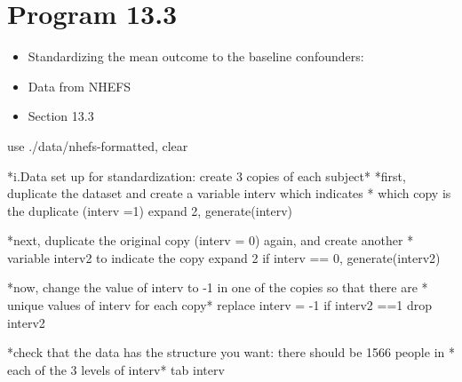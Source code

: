 \documentclass[
  10pt,
  a4paper,
]{book}
\newenvironment{Shaded}{\begin{snugshade}}{\end{snugshade}}
\newcommand{\KeywordTok}[1]{\textcolor[rgb]{0.00,0.46,0.62}{#1}}
\newcommand{\NormalTok}[1]{\textcolor[rgb]{0.00,0.46,0.62}{#1}}
\newcommand{\OtherTok}[1]{\textcolor[rgb]{0.00,0.46,0.62}{#1}}
\providecommand{\tightlist}{%
  \setlength{\itemsep}{0pt}\setlength{\parskip}{0pt}}
\begin{document}
\section{Program 13.3}\label{program-13.3-1}

\begin{itemize}
\tightlist
\item
  Standardizing the mean outcome to the baseline confounders:
\item
  Data from NHEFS
\item
  Section 13.3
\end{itemize}

\begin{Shaded}
\begin{Highlighting}[]
\KeywordTok{use}\NormalTok{ ./}\KeywordTok{data}\NormalTok{/nhefs{-}formatted, }\KeywordTok{clear}

\NormalTok{*i.Data }\KeywordTok{set}\NormalTok{ up }\KeywordTok{for}\NormalTok{ standardization: create 3 copies }\KeywordTok{of}\NormalTok{ each subject*}
\NormalTok{*first, duplicate the dataset and create a }\KeywordTok{variable}\NormalTok{ \textquotesingle{}interv\textquotesingle{} which indicates}
\NormalTok{* which copy is the duplicate (interv =1)}
\NormalTok{expand 2, }\KeywordTok{generate}\NormalTok{(interv)}

\NormalTok{*next, duplicate the original copy (interv = 0) again, and create another}
\NormalTok{* }\KeywordTok{variable}\NormalTok{ \textquotesingle{}interv2\textquotesingle{} to indicate the copy}
\NormalTok{expand 2 }\KeywordTok{if}\NormalTok{ interv == 0, }\KeywordTok{generate}\NormalTok{(interv2)}

\NormalTok{*now, change the }\OtherTok{value} \KeywordTok{of}\NormalTok{ \textquotesingle{}interv\textquotesingle{} to {-}1 }\KeywordTok{in}\NormalTok{ one }\KeywordTok{of}\NormalTok{ the copies so that there are}
\NormalTok{* }\KeywordTok{unique} \KeywordTok{values} \KeywordTok{of}\NormalTok{ interv }\KeywordTok{for}\NormalTok{ each copy*}
\KeywordTok{replace}\NormalTok{ interv = {-}1  }\KeywordTok{if}\NormalTok{ interv2 ==1}
\KeywordTok{drop}\NormalTok{ interv2 }

\NormalTok{*check that the }\KeywordTok{data}\NormalTok{ has the structure you want: there should }\KeywordTok{be}\NormalTok{ 1566 people }\KeywordTok{in}
\NormalTok{* each }\KeywordTok{of}\NormalTok{ the 3 }\KeywordTok{levels} \KeywordTok{of}\NormalTok{ interv*}
\KeywordTok{tab}\NormalTok{ interv}


\end{Highlighting}
\end{Shaded}
\end{document}

